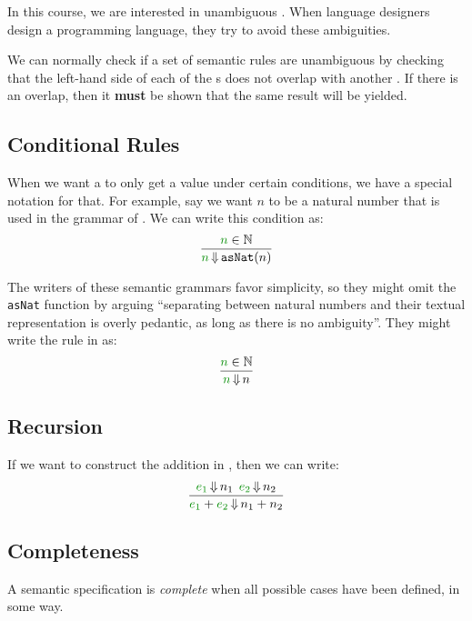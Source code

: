 In this course, we are interested in unambiguous .
When language designers design a programming language, they try to avoid these ambiguities.

We can normally check if a set of semantic rules are unambiguous by checking that the left-hand side of each of the s does not overlap with another .
If there is an overlap, then it \textbf{must} be shown that the same result will be yielded.

\subsection{Conditional Rules}\label{subsec:Conditional_Rules}
When we want a  to only get a value under certain conditions, we have a special notation for that.
For example, say we want $n$ to be a natural number that is used in the grammar of .
We can write this condition as:
\begin{equation}\label{eq:Conditional_Rules}
  \frac{\SemanticInput{n} \in \NaturalNumbers}{\SemanticInput{n} \EvaluatesTo \mathtt{asNat}(n)}
\end{equation}

The writers of these semantic grammars favor simplicity, so they might omit the \texttt{asNat} function by arguing ``separating between natural numbers and their textual representation is overly pedantic, as long as there is no ambiguity''.
They might write the rule in  as:
\begin{equation}\label{eq:Conditional_Rules_Simplified}
  \frac{\SemanticInput{n} \in \NaturalNumbers}{\SemanticInput{n} \EvaluatesTo n}
\end{equation}

\subsection{Recursion}\label{subsec:Semantics_Recursion}
If we want to construct the addition in , then we can write:
\begin{equation}\label{eq:Semantics_Recursion}
  \frac{\SemanticInput{e_{1}} \EvaluatesTo n_{1} \:\: \SemanticInput{e_{2}} \EvaluatesTo n_{2}}{\SemanticInput{e_{1}}+\SemanticInput{e_{2}} \EvaluatesTo n_{1}+n_{2}}
\end{equation}

\subsection{Completeness}\label{subsec:Semantic_Completeness}
\begin{definition}[Complete]\label{def:Semantic_Completeness}
  A semantic specification is \emph{complete} when all possible cases have been defined, in some way.
\end{definition}

